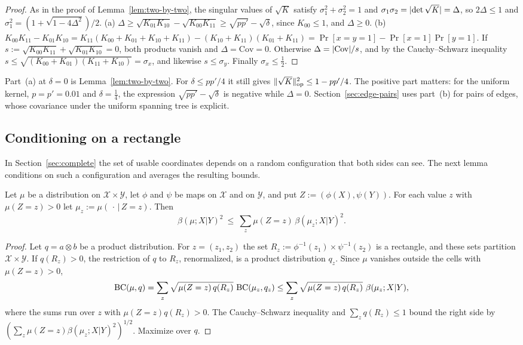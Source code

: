 \begin{proof}
As in the proof of Lemma~\ref{lem:two-by-two}, the singular values of $\sqrt K$ satisfy $\sigma_1^2+\sigma_2^2=1$ and $\sigma_1\sigma_2=\lvert \det\sqrt K\rvert=\Delta$, so $2\Delta\le1$ and $\sigma_1^2=(1+\sqrt{1-4\Delta^2})/2$. (a) $\Delta\ge\sqrt{K_{01}K_{10}}-\sqrt{K_{00}K_{11}}\ge\sqrt{pp'}-\sqrt\delta$, since $K_{00}\le1$, and $\Delta\ge0$. (b) $K_{00}K_{11}-K_{01}K_{10}=K_{11}(K_{00}+K_{01}+K_{10}+K_{11})-(K_{10}+K_{11})(K_{01}+K_{11})=\Pr[x=y=1]-\Pr[x=1]\Pr[y=1]$. If $s:=\sqrt{K_{00}K_{11}}+\sqrt{K_{01}K_{10}}=0$, both products vanish and $\Delta=\mathrm{Cov}=0$. Otherwise $\Delta=\lvert \mathrm{Cov}\rvert/s$, and by the Cauchy--Schwarz inequality $s\le\sqrt{(K_{00}+K_{01})(K_{11}+K_{10})}=\sigma_x$, and likewise $s\le\sigma_y$. Finally $\sigma_x\le\frac12$.
\end{proof}

Part~(a) at $\delta=0$ is Lemma~\ref{lem:two-by-two}. For $\delta\le pp'/4$ it still gives $\lVert \sqrt K\rVert_{\mathrm{op}}^2\le1-pp'/4$. The positive part matters: for the uniform kernel, $p=p'=0.01$ and $\delta=\frac14$, the expression $\sqrt{pp'}-\sqrt\delta$ is negative while $\Delta=0$. Section~\ref{sec:edge-pairs} uses part~(b) for pairs of edges, whose covariance under the uniform spanning tree is explicit.

\subsection{Conditioning on a rectangle}

In Section~\ref{sec:complete} the set of usable coordinates depends on a random configuration that both sides can see. The next lemma conditions on such a configuration and averages the resulting bounds.

\begin{lemma}\label{lem:avg-cond}
Let $\mu$ be a distribution on $\mathcal X\times\mathcal Y$, let $\phi$ and $\psi$ be maps on $\mathcal X$ and on $\mathcal Y$, and put $Z:=(\phi(X),\psi(Y))$. For each value $z$ with $\mu(Z=z)>0$ let $\mu_z:=\mu(\,\cdot\,|\,Z=z)$. Then
\[
  \beta(\mu;X|Y)^2\ \le\ \sum_z\mu(Z=z)\,\beta(\mu_z;X|Y)^2 .
\]
\end{lemma}

\begin{proof}
Let $q=a\otimes b$ be a product distribution. For $z=(z_1,z_2)$ the set $R_z:=\phi^{-1}(z_1)\times\psi^{-1}(z_2)$ is a rectangle, and these sets partition $\mathcal X\times\mathcal Y$. If $q(R_z)>0$, the restriction of $q$ to $R_z$, renormalized, is a product distribution $q_z$. Since $\mu$ vanishes outside the cells with $\mu(Z=z)>0$,
\[
  \BC(\mu,q)=\sum_z\sqrt{\mu(Z=z)\,q(R_z)}\ \BC(\mu_z,q_z)\le\sum_z\sqrt{\mu(Z=z)\,q(R_z)}\ \beta(\mu_z;X|Y),
\]
where the sums run over $z$ with $\mu(Z=z)q(R_z)>0$. The Cauchy--Schwarz inequality and $\sum_zq(R_z)\le1$ bound the right side by $(\sum_z\mu(Z=z)\beta(\mu_z;X|Y)^2)^{1/2}$. Maximize over $q$.
\end{proof}

